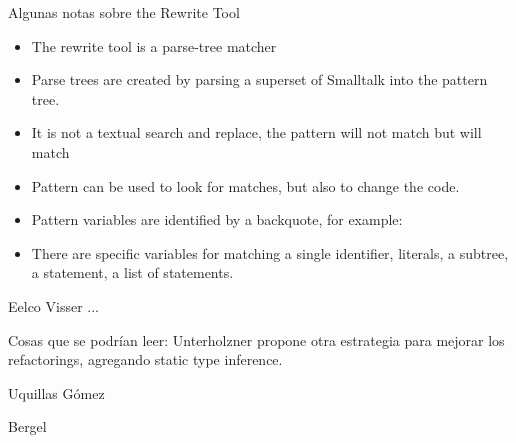 \documentclass{article}
\begin{document}
Algunas notas sobre the Rewrite Tool \cite{Robe97a}
\begin{itemize}
 \item The rewrite tool is a parse-tree matcher
 \item Parse trees are created by parsing a superset of Smalltalk into the pattern tree.
 \item It is not a textual search and replace, the pattern  will not match  but will match 
 \item Pattern can be used to look for matches, but also to change the code.
 \item Pattern variables are identified by a backquote, for example: 
 \item There are specific variables for matching a single identifier, literals, a subtree, a statement, a list of statements.
\end{itemize}


Eelco Visser \cite{Viss05a} ...

Cosas que se podrían leer:
Unterholzner \cite{Unte12a} propone otra estrategia para mejorar los refactorings, agregando static type inference.

Uquillas Gómez \etal \cite{Uqui12a}

Bergel \etal \cite{Berg08c} 




\end{document}
